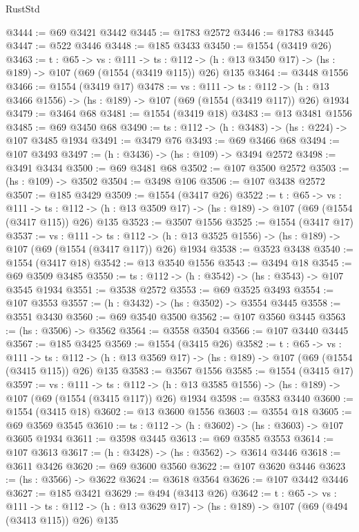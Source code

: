 \begin{lexlean}{RustStd}
\begin{coremodule}
{\begin{coremodule}
{{{{{{{{{@3444 := @69 @3421 @3442
@3445 := @1783 @2572
@3446 := @1783 @3445
@3447 := @522 @3446
@3448 := @185 @3433
@3450 := @1554 (@3419 @26)
@3463 := {t : @65} ->
  {vs : @111} ->
  {ts : @112} -> (h : @13 @3450 @17) -> (hs : @189) -> @107 (@69 (@1554 (@3419 @115)) @26) @135
@3464 := @3448 @1556
@3466 := @1554 (@3419 @17)
@3478 := {vs : @111} ->
  {ts : @112} -> (h : @13 @3466 @1556) -> (hs : @189) -> @107 (@69 (@1554 (@3419 @117)) @26) @1934
@3479 := @3464 @68
@3481 := @1554 (@3419 @18)
@3483 := @13 @3481 @1556
@3485 := @69 @3450 @68
@3490 := {ts : @112} -> (h : @3483) -> (hs : @224) -> @107 @3485 @1934
@3491 := @3479 @76
@3493 := @69 @3466 @68
@3494 := @107 @3493
@3497 := (h : @3436) -> (hs : @109) -> @3494 @2572
@3498 := @3491 @3434
@3500 := @69 @3481 @68
@3502 := @107 @3500 @2572
@3503 := (hs : @109) -> @3502
@3504 := @3498 @106
@3506 := @107 @3438 @2572
@3507 := @185 @3429
@3509 := @1554 (@3417 @26)
@3522 := {t : @65} ->
  {vs : @111} ->
  {ts : @112} -> (h : @13 @3509 @17) -> (hs : @189) -> @107 (@69 (@1554 (@3417 @115)) @26) @135
@3523 := @3507 @1556
@3525 := @1554 (@3417 @17)
@3537 := {vs : @111} ->
  {ts : @112} -> (h : @13 @3525 @1556) -> (hs : @189) -> @107 (@69 (@1554 (@3417 @117)) @26) @1934
@3538 := @3523 @3438
@3540 := @1554 (@3417 @18)
@3542 := @13 @3540 @1556
@3543 := @3494 @18
@3545 := @69 @3509 @3485
@3550 := {ts : @112} -> (h : @3542) -> (hs : @3543) -> @107 @3545 @1934
@3551 := @3538 @2572
@3553 := @69 @3525 @3493
@3554 := @107 @3553
@3557 := (h : @3432) -> (hs : @3502) -> @3554 @3445
@3558 := @3551 @3430
@3560 := @69 @3540 @3500
@3562 := @107 @3560 @3445
@3563 := (hs : @3506) -> @3562
@3564 := @3558 @3504
@3566 := @107 @3440 @3445
@3567 := @185 @3425
@3569 := @1554 (@3415 @26)
@3582 := {t : @65} ->
  {vs : @111} ->
  {ts : @112} -> (h : @13 @3569 @17) -> (hs : @189) -> @107 (@69 (@1554 (@3415 @115)) @26) @135
@3583 := @3567 @1556
@3585 := @1554 (@3415 @17)
@3597 := {vs : @111} ->
  {ts : @112} -> (h : @13 @3585 @1556) -> (hs : @189) -> @107 (@69 (@1554 (@3415 @117)) @26) @1934
@3598 := @3583 @3440
@3600 := @1554 (@3415 @18)
@3602 := @13 @3600 @1556
@3603 := @3554 @18
@3605 := @69 @3569 @3545
@3610 := {ts : @112} -> (h : @3602) -> (hs : @3603) -> @107 @3605 @1934
@3611 := @3598 @3445
@3613 := @69 @3585 @3553
@3614 := @107 @3613
@3617 := (h : @3428) -> (hs : @3562) -> @3614 @3446
@3618 := @3611 @3426
@3620 := @69 @3600 @3560
@3622 := @107 @3620 @3446
@3623 := (hs : @3566) -> @3622
@3624 := @3618 @3564
@3626 := @107 @3442 @3446
@3627 := @185 @3421
@3629 := @494 (@3413 @26)
@3642 := {t : @65} ->
  {vs : @111} ->
  {ts : @112} -> (h : @13 @3629 @17) -> (hs : @189) -> @107 (@69 (@494 (@3413 @115)) @26) @135
}}}}}}}}}
\end{coremodule}}
\end{coremodule}
\end{lexlean}

